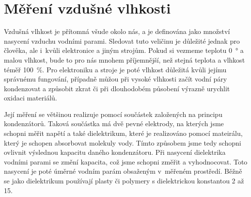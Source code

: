 \section{Měření vzdušné vlhkosti}

Vzdušná vlhkost je přítomná všude okolo nás, a je definována jako množství nasycení vzduchu vodními parami. Sledovat tuto veličinu je důležité jednak pro člověka, ale i~kvůli elektronice a jiným strojům. Pokud si vezmeme teplotu \SI{0}{\degree} a malou vlhkost, bude to pro nás mnohem příjemnější, než stejná teplota a vlhkost téměř \SI{100}{\percent}. Pro elektroniku a stroje je poté vlhkost důležitá kvůli jejímu správnému fungování, případně můžou při vysoké vlhkosti začít vodní páry kondenzovat a způsobit zkrat či při dlouhodobém působení výrazně urychlit oxidaci materiálů.

Její měření se většinou realizuje pomocí součástek založených na principu kondenzátorů. Taková součástka má dvě pevné elektrody, na kterých jsme schopni měřit napětí a také dielektrikum, které je realizováno pomocí mateirálu, který je schopen absorbovat molekuly vody. Tímto způsobem jsme tedy schopni ovlivnit výslednou kapacitu daného kondenzátoru. Při nasycení dielektrika vodními parami se změní kapacita, což jsme schopni změřit a vyhodnocovat. Toto nasycení je poté úměrné vodním parám obsaženým v~měřeném prostředí. Běžně se jako dielektrikum používají plasty či polymery s dielektrickou konstantou 2 až 15.